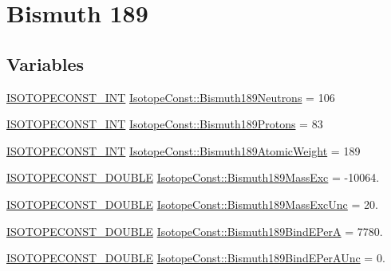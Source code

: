 \hypertarget{group___isotope_const-_bismuth-_bi189}{}\section{Bismuth 189}
\label{group___isotope_const-_bismuth-_bi189}
\subsection*{Variables}
\begin{DoxyCompactItemize}
\item 
\mbox{\hyperlink{group___isotope_const-_macros_ga5f18360b3e99483a35c32d789e62621c}{I\+S\+O\+T\+O\+P\+E\+C\+O\+N\+S\+T\+\_\+\+I\+NT}} \mbox{\hyperlink{group___isotope_const-_bismuth-_bi189_gaa96f26e9efb470e65df231719fceb9fa}{Isotope\+Const\+::\+Bismuth189\+Neutrons}} = 106
\item 
\mbox{\hyperlink{group___isotope_const-_macros_ga5f18360b3e99483a35c32d789e62621c}{I\+S\+O\+T\+O\+P\+E\+C\+O\+N\+S\+T\+\_\+\+I\+NT}} \mbox{\hyperlink{group___isotope_const-_bismuth-_bi189_ga55c5cb5ac50fde1ac1f69072e53bedf8}{Isotope\+Const\+::\+Bismuth189\+Protons}} = 83
\item 
\mbox{\hyperlink{group___isotope_const-_macros_ga5f18360b3e99483a35c32d789e62621c}{I\+S\+O\+T\+O\+P\+E\+C\+O\+N\+S\+T\+\_\+\+I\+NT}} \mbox{\hyperlink{group___isotope_const-_bismuth-_bi189_gab45b4e9c48a817b9961343eb4846d7ef}{Isotope\+Const\+::\+Bismuth189\+Atomic\+Weight}} = 189
\item 
\mbox{\hyperlink{group___isotope_const-_macros_ga8f45a7272ce02c0b4c65c44636ed719a}{I\+S\+O\+T\+O\+P\+E\+C\+O\+N\+S\+T\+\_\+\+D\+O\+U\+B\+LE}} \mbox{\hyperlink{group___isotope_const-_bismuth-_bi189_ga8c467cdbdea93ebc39ff68abc6e2e0ba}{Isotope\+Const\+::\+Bismuth189\+Mass\+Exc}} = -\/10064.
\item 
\mbox{\hyperlink{group___isotope_const-_macros_ga8f45a7272ce02c0b4c65c44636ed719a}{I\+S\+O\+T\+O\+P\+E\+C\+O\+N\+S\+T\+\_\+\+D\+O\+U\+B\+LE}} \mbox{\hyperlink{group___isotope_const-_bismuth-_bi189_ga10b5c0f858bcc09a9098b786bf5c169a}{Isotope\+Const\+::\+Bismuth189\+Mass\+Exc\+Unc}} = 20.
\item 
\mbox{\hyperlink{group___isotope_const-_macros_ga8f45a7272ce02c0b4c65c44636ed719a}{I\+S\+O\+T\+O\+P\+E\+C\+O\+N\+S\+T\+\_\+\+D\+O\+U\+B\+LE}} \mbox{\hyperlink{group___isotope_const-_bismuth-_bi189_ga3f3fb33a2a2e2ff686bc3c2a5c6863a4}{Isotope\+Const\+::\+Bismuth189\+Bind\+E\+PerA}} = 7780.
\item 
\mbox{\hyperlink{group___isotope_const-_macros_ga8f45a7272ce02c0b4c65c44636ed719a}{I\+S\+O\+T\+O\+P\+E\+C\+O\+N\+S\+T\+\_\+\+D\+O\+U\+B\+LE}} \mbox{\hyperlink{group___isotope_const-_bismuth-_bi189_gac9998c4e66a7e56b9702e8017a3db905}{Isotope\+Const\+::\+Bismuth189\+Bind\+E\+Per\+A\+Unc}} = 0.

\end{DoxyCompactItemize}
